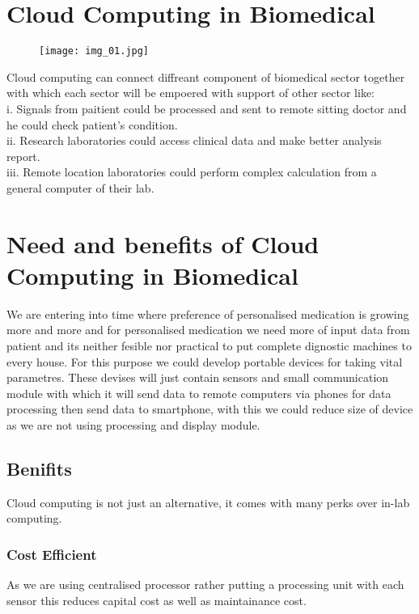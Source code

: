 \documentclass[12pt]{article}
\begin{document}
	\section{Cloud Computing in Biomedical} 
	\begin{figure}[h]
	\centering	\texttt{[image: img\_01.jpg]}
	\end{figure}

	Cloud computing can connect diffreant component of biomedical sector together with which each sector will be empoered with support of other sector like:
	\\
	i. Signals from paitient could be processed and sent to remote sitting doctor and he could check patient's condition.
	\\
	ii. Research laboratories could access clinical data and make better analysis report.
	\\
	iii. Remote location laboratories could perform complex calculation from a general computer of their lab.
	\\
	\clearpage
	\section{Need and benefits of Cloud Computing in Biomedical}
	We are entering into time where preference of personalised medication is growing more and more and for personalised medication we need more of input data from patient and its neither fesible nor practical to put complete dignostic machines to every house. For this purpose we could develop portable devices for taking vital parametres. These devises will just contain sensors and small communication module with which it will send data to remote computers via phones for data processing then send data to smartphone, with this we could reduce size of device as we are not using processing and display module. 
	\\
	\subsection{Benifits}
	Cloud computing is not just an alternative, it comes with many perks over in-lab computing.
	
	\subsubsection{Cost Efficient}
	As we are using centralised processor rather putting a processing unit with each sensor this reduces capital cost as well as maintainance cost.
	\\
\end{document}
